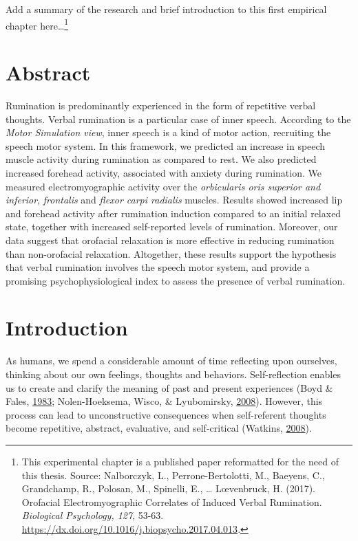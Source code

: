 \documentclass[a4paper,12pt,twoside,openright,oldfontcommands]{memoir}
\let\rmarkdownfootnote\footnote%
\def\footnote{\protect\rmarkdownfootnote}
\begin{document}
Add a summary of the research and brief introduction to this first
empirical chapter here\ldots{}\footnote{This experimental chapter is a
  published paper reformatted for the need of this thesis. Source:
  Nalborczyk, L., Perrone-Bertolotti, M., Baeyens, C., Grandchamp, R.,
  Polosan, M., Spinelli, E., \ldots{} L\oe venbruck, H. (2017).
  Orofacial Electromyographic Correlates of Induced Verbal Rumination.
  \emph{Biological Psychology, 127}, 53-63.
  \url{https://dx.doi.org/10.1016/j.biopsycho.2017.04.013}.}

\section{Abstract}\label{abstract-1}

Rumination is predominantly experienced in the form of repetitive verbal
thoughts. Verbal rumination is a particular case of inner speech.
According to the \emph{Motor Simulation view}, inner speech is a kind of
motor action, recruiting the speech motor system. In this framework, we
predicted an increase in speech muscle activity during rumination as
compared to rest. We also predicted increased forehead activity,
associated with anxiety during rumination. We measured electromyographic
activity over the \emph{orbicularis oris superior and inferior},
\emph{frontalis} and \emph{flexor carpi radialis} muscles. Results
showed increased lip and forehead activity after rumination induction
compared to an initial relaxed state, together with increased
self-reported levels of rumination. Moreover, our data suggest that
orofacial relaxation is more effective in reducing rumination than
non-orofacial relaxation. Altogether, these results support the
hypothesis that verbal rumination involves the speech motor system, and
provide a promising psychophysiological index to assess the presence of
verbal rumination.

\section{Introduction}\label{introduction}

As humans, we spend a considerable amount of time reflecting upon
ourselves, thinking about our own feelings, thoughts and behaviors.
Self-reflection enables us to create and clarify the meaning of past and
present experiences (Boyd \& Fales,
\protect\hyperlink{ref-boyd_reflective_1983}{1983}; Nolen-Hoeksema,
Wisco, \& Lyubomirsky,
\protect\hyperlink{ref-Nolen-Hoeksema2008}{2008}). However, this process
can lead to unconstructive consequences when self-referent thoughts
become repetitive, abstract, evaluative, and self-critical (Watkins,
\protect\hyperlink{ref-Watkins2008}{2008}).
\end{document}
